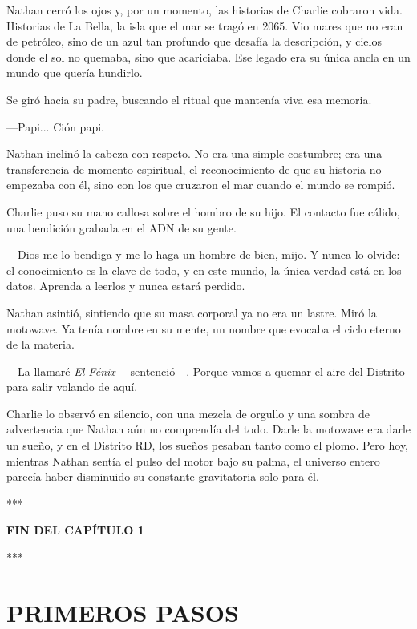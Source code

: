 \documentclass[11pt,twoside]{book}
\begin{document}
Nathan cerró los ojos y, por un momento, las historias de Charlie cobraron vida. Historias de La Bella, la isla que el mar se tragó en 2065. Vio mares que no eran de petróleo, sino de un azul tan profundo que desafía la descripción, y cielos donde el sol no quemaba, sino que acariciaba. Ese legado era su única ancla en un mundo que quería hundirlo.

Se giró hacia su padre, buscando el ritual que mantenía viva esa memoria.

---Papi... Ción papi.

Nathan inclinó la cabeza con respeto. No era una simple costumbre; era una transferencia de momento espiritual, el reconocimiento de que su historia no empezaba con él, sino con los que cruzaron el mar cuando el mundo se rompió.

Charlie puso su mano callosa sobre el hombro de su hijo. El contacto fue cálido, una bendición grabada en el ADN de su gente.

---Dios me lo bendiga y me lo haga un hombre de bien, mijo. Y nunca lo olvide: el conocimiento es la clave de todo, y en este mundo, la única verdad está en los datos. Aprenda a leerlos y nunca estará perdido.

Nathan asintió, sintiendo que su masa corporal ya no era un lastre. Miró la motowave. Ya tenía nombre en su mente, un nombre que evocaba el ciclo eterno de la materia.

---La llamaré \textit{El Fénix} ---sentenció---. Porque vamos a quemar el aire del Distrito para salir volando de aquí.

Charlie lo observó en silencio, con una mezcla de orgullo y una sombra de advertencia que Nathan aún no comprendía del todo. Darle la motowave era darle un sueño, y en el Distrito RD, los sueños pesaban tanto como el plomo. Pero hoy, mientras Nathan sentía el pulso del motor bajo su palma, el universo entero parecía haber disminuido su constante gravitatoria solo para él.

\bigskip
\begin{center}***\end{center}
\bigskip

\textbf{FIN DEL CAPÍTULO 1}


\bigskip
\begin{center}***\end{center}
\bigskip

\chapter{PRIMEROS PASOS}
\end{document}
